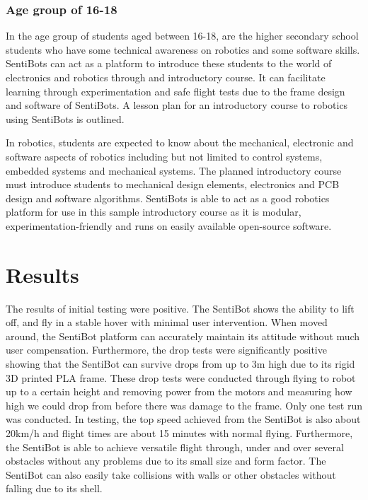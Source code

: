 \documentclass[12pt]{article}
\begin{document}
\subsubsection{Age group of 16-18}

In the age group of students aged between 16-18, are the higher secondary school students who have some technical awareness on robotics and some software skills. SentiBots can act as a platform to introduce these students to the world of electronics and robotics through and introductory course. It can facilitate learning through experimentation and safe flight tests due to the frame design and software of SentiBots. A lesson plan for an introductory course to robotics using SentiBots is outlined.

In robotics, students are expected to know about the mechanical, electronic and software aspects of robotics including but not limited to control systems, embedded systems and mechanical systems. The planned introductory course must introduce students to mechanical design elements, electronics and PCB design and software algorithms. SentiBots is able to act as a good robotics platform for use in this sample introductory course as it is modular, experimentation-friendly and runs on easily available open-source software.

\section{Results}

The results of initial testing were positive. The SentiBot shows the ability to lift off, and fly in a stable hover with minimal user intervention. When moved around, the SentiBot platform can accurately maintain its attitude without much user compensation. Furthermore, the drop tests were significantly positive showing that the SentiBot can survive drops from up to 3m high due to its rigid 3D printed PLA frame. These drop tests were conducted through flying to robot up to a certain height and removing power from the motors and measuring how high we could drop from before there was damage to the frame. Only one test run was conducted. In testing, the top speed achieved from the SentiBot is also about 20km/h and flight times are about 15 minutes with normal flying. Furthermore, the SentiBot is able to achieve versatile flight through, under and over several obstacles without any problems due to its small size and form factor. The SentiBot can also easily take collisions with walls or other obstacles without falling due to its shell. 
\end{document}
